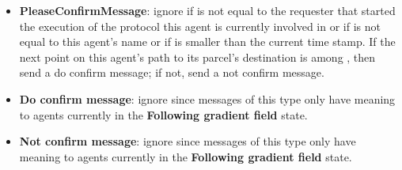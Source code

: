 \begin{itemize}
    \item \textbf{PleaseConfirmMessage}: ignore if  is not equal to the requester that started the execution of the protocol this agent is currently involved in or if  is not equal to this agent's name or if  is smaller than the current time stamp. If the next point on this agent's path to its parcel's destination is among , then send a do confirm message; if not, send a not confirm message.
    \item \textbf{Do confirm message}: ignore since messages of this type only have meaning to agents currently in the \textbf{Following gradient field} state.
    \item \textbf{Not confirm message}: ignore since messages of this type only have meaning to agents currently in the \textbf{Following gradient field} state.
\end{itemize}

